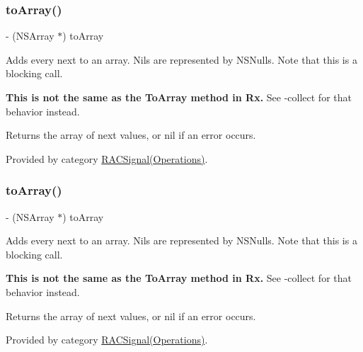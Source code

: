 \subsubsection{\texorpdfstring{to\+Array()}{toArray()}\hspace{0.1cm}{\footnotesize\ttfamily [2/3]}}
{\footnotesize\ttfamily -\/ (N\+S\+Array $\ast$) to\+Array \begin{DoxyParamCaption}{ }\end{DoxyParamCaption}}

Adds every {\ttfamily next} to an array. Nils are represented by N\+S\+Nulls. Note that this is a blocking call.

{\bfseries This is not the same as the {\ttfamily To\+Array} method in Rx.} See -\/collect for that behavior instead.

Returns the array of {\ttfamily next} values, or nil if an error occurs. 

Provided by category \mbox{\hyperlink{category_r_a_c_signal_07_operations_08_a5b7a649ea4635f423b73cd4924652fe5}{R\+A\+C\+Signal(\+Operations)}}.

\mbox{\label{interface_r_a_c_signal_a5b7a649ea4635f423b73cd4924652fe5}} 
\subsubsection{\texorpdfstring{to\+Array()}{toArray()}\hspace{0.1cm}{\footnotesize\ttfamily [3/3]}}
{\footnotesize\ttfamily -\/ (N\+S\+Array $\ast$) to\+Array \begin{DoxyParamCaption}{ }\end{DoxyParamCaption}}

Adds every {\ttfamily next} to an array. Nils are represented by N\+S\+Nulls. Note that this is a blocking call.

{\bfseries This is not the same as the {\ttfamily To\+Array} method in Rx.} See -\/collect for that behavior instead.

Returns the array of {\ttfamily next} values, or nil if an error occurs. 

Provided by category \mbox{\hyperlink{category_r_a_c_signal_07_operations_08_a5b7a649ea4635f423b73cd4924652fe5}{R\+A\+C\+Signal(\+Operations)}}.

